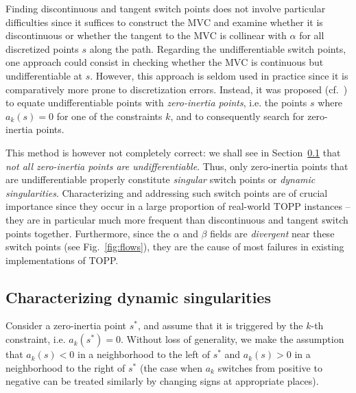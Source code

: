 \documentclass[9pt,technote]{IEEEtran}
\newcommand{\MVC}{\mathrm{MVC}}
\begin{document}
Finding discontinuous and tangent switch points does not involve
particular difficulties since it suffices to construct the $\MVC$ and
examine whether it is discontinuous or whether the tangent to the
$\MVC$ is collinear with $\alpha$ for all discretized points $s$ along
the path. Regarding the undifferentiable switch points, one approach
could consist in checking whether the $\MVC$ is continuous but
undifferentiable at $s$. However, this approach is seldom used in
practice since it is comparatively more prone to discretization
errors. Instead, it was proposed
(cf.~\cite{PJ87jra,SY89tra,SL92jdsmc,ChoX05book,KS12rss}) to equate
undifferentiable points with \emph{zero-inertia points}, i.e. the
points $s$ where $a_k(s)=0$ for one of the constraints $k$, and to
consequently search for zero-inertia points.

This method is however not completely correct: we shall see in
Section~\ref{sec:charact} that \emph{not all zero-inertia points are
  undifferentiable}.
%
%
Thus, only zero-inertia points that are undifferentiable properly
constitute \emph{singular} switch points or \emph{dynamic
  singularities}. Characterizing and addressing such switch points are
of crucial importance since they occur in a large proportion of
real-world TOPP instances -- they are in particular much more frequent
than discontinuous and tangent switch points together. Furthermore,
since the $\alpha$ and $\beta$ fields are \emph{divergent} near these
switch points (see Fig.~\ref{fig:flows}), they are the cause of most
failures in existing implementations of TOPP.
 
\subsection{Characterizing dynamic singularities}
\label{sec:charact}

Consider a zero-inertia point $s^*$, and assume that it is triggered
by the $k$-th constraint, i.e. $a_k(s^*)=0$. Without loss of
generality, we make the assumption that $a_k(s)<0$ in a neighborhood
to the left of $s^*$ and $a_k(s)>0$ in a neighborhood to the right of
$s^*$ (the case when $a_k$ switches from positive to negative can be
treated similarly by changing signs at appropriate places).
\end{document}
